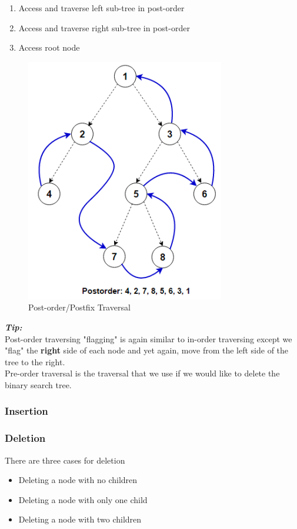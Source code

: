 \documentclass[hidelinks,11pt]{article}
\begin{document}
\begin{enumerate}
    \item Access and traverse left sub-tree in post-order
    \item Access and traverse right sub-tree in post-order
    \item Access root node
\end{enumerate}
\begin{figure}[h!]
    \centering
    \includegraphics[scale=0.8]{postfix.png}
    \caption{Post-order/Postfix Traversal}
\end{figure}
\textit{\textbf{Tip:}}\\
Post-order traversing "flagging" is again similar to in-order traversing except we "flag" the \textbf{right} side of each node and yet again, move from the left side of the tree to the right. \\[0.5\baselineskip]
Pre-order traversal is the traversal that we use if we would like to delete the binary search tree.
\subsubsection{Insertion}
\subsubsection{Deletion}
There are three cases for deletion
\begin{itemize}
    \item Deleting a node with no children
    \item Deleting a node with only one child
    \item Deleting a node with two children
\end{itemize}
\end{document}
